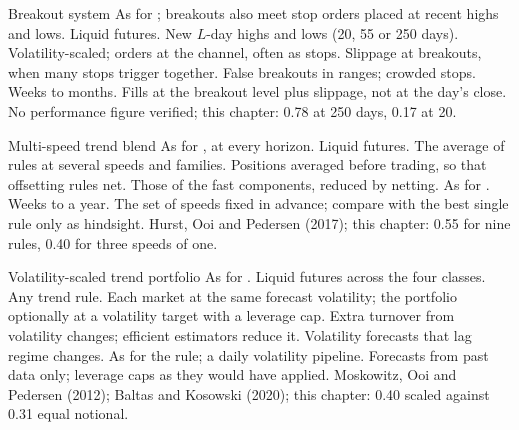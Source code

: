 \begin{strategyfile}{Breakout system}\label{strat:s1:trend-following:breakout}
 As for ; breakouts also meet stop orders placed at recent highs and lows.
 Liquid futures.
 New $L$-day highs and lows (20, 55 or 250 days).
 Volatility-scaled; orders at the channel, often as stops.
 Slippage at breakouts, when many stops trigger together.
 False breakouts in ranges; crowded stops.
 Weeks to months.
 Fills at the breakout level plus slippage, not at the day's close.
 No performance figure verified; this chapter: 0.78 at 250 days, 0.17 at 20.
\end{strategyfile}

\begin{strategyfile}{Multi-speed trend blend}\label{strat:s1:trend-following:blend}
 As for , at every horizon.
 Liquid futures.
 The average of rules at several speeds and families.
 Positions averaged before trading, so that offsetting rules net.
 Those of the fast components, reduced by netting.
 As for .
 Weeks to a year.
 The set of speeds fixed in advance; compare with the best single rule only as hindsight.
 Hurst, Ooi and Pedersen (2017); this chapter: 0.55 for nine rules, 0.40 for three speeds of one.
\end{strategyfile}

\begin{strategyfile}{Volatility-scaled trend portfolio}\label{strat:s1:trend-following:volscaled}
 As for .
 Liquid futures across the four classes.
 Any trend rule.
 Each market at the same forecast volatility; the portfolio optionally at a volatility target with a leverage cap.
 Extra turnover from volatility changes; efficient estimators reduce it.
 Volatility forecasts that lag regime changes.
 As for the rule; a daily volatility pipeline.
 Forecasts from past data only; leverage caps as they would have applied.
 Moskowitz, Ooi and Pedersen (2012); Baltas and Kosowski (2020); this chapter: 0.40 scaled against 0.31 equal notional.
\end{strategyfile}

